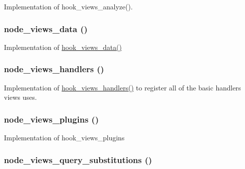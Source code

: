Implementation of hook\_\-views\_\-analyze(). \hypertarget{group__views__node__module_g5e6beb23be547a792dba68f1066d4b9d}{
\subsubsection[{node\_\-views\_\-data}]{\setlength{\rightskip}{0pt plus 5cm}node\_\-views\_\-data ()}}
\label{group__views__node__module_g5e6beb23be547a792dba68f1066d4b9d}


Implementation of \hyperlink{group__views__hooks_g227057901681e4a33e33c199c7a8c989}{hook\_\-views\_\-data()} \hypertarget{group__views__node__module_g601148852d1241238b6d713ca487ca85}{
\subsubsection[{node\_\-views\_\-handlers}]{\setlength{\rightskip}{0pt plus 5cm}node\_\-views\_\-handlers ()}}
\label{group__views__node__module_g601148852d1241238b6d713ca487ca85}


Implementation of \hyperlink{group__views__hooks_gbf506f44bd8d8a86876f27396f5341ed}{hook\_\-views\_\-handlers()} to register all of the basic handlers views uses. \hypertarget{group__views__node__module_gbad6697258bb04f10bbb73608ab1f52c}{
\subsubsection[{node\_\-views\_\-plugins}]{\setlength{\rightskip}{0pt plus 5cm}node\_\-views\_\-plugins ()}}
\label{group__views__node__module_gbad6697258bb04f10bbb73608ab1f52c}


Implementation of hook\_\-views\_\-plugins \hypertarget{group__views__node__module_g207da742d80ba74315d7084eeed285b9}{
\subsubsection[{node\_\-views\_\-query\_\-substitutions}]{\setlength{\rightskip}{0pt plus 5cm}node\_\-views\_\-query\_\-substitutions ()}}
\label{group__views__node__module_g207da742d80ba74315d7084eeed285b9}


